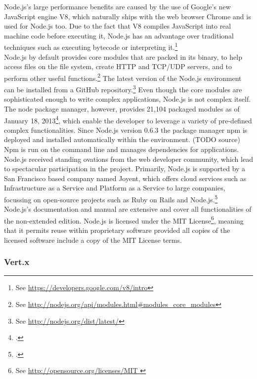 Node.js's large performance benefits are caused by the use of Google's new JavaScript engine V8, which naturally ships with the web browser Chrome and is used for Node.js too. Due to the fact that V8 compiles JavaScript into
real machine code before executing it, Node.js has an advantage over 
traditional techniques such as executing bytecode or interpreting it.\footnote{See \url{https://developers.google.com/v8/intro}}
\\
Node.js by default provides core modules that are packed in its binary, to help
access files on the file system, create HTTP and TCP/UDP servers, and to perform
other useful functions.\footnote{See \url{http://nodejs.org/api/modules.html\#modules_core_modules}}
The latest version of the Node.js environment can be installed from a GitHub repository.\footnote{See \url{http://nodejs.org/dist/latest/}}
Even though the core modules are sophisticated enough to write complex applications, Node.js is not complex itself.
The node package manager, however, provides 21,104 packaged modules as of January 18, 2013\footcite[Cf.][]{node_packages}, which enable the developer to leverage a variety of pre-defined complex functionalities.
Since Node.js version 0.6.3 the package manager npm is deployed and installed automatically within the environment. (TODO source) Npm is run on the command line and manages dependencies for applications.\\
Node.js received standing ovations from the web developer community, which lead to spectacular participation in the project. Primarily, Node.js is supported by a San Francisco based company named Joyent, which offers cloud services such as Infrastructure as a Service and Platform as a Service to large companies, focussing on open-source projects such as Ruby on Rails and Node.js.\footcite[Cf.][]{http://jaxenter.com/node-js-moves-to-joyent-32530.html}\\
Node.js's documentation and manual are extensive and cover all functionalities of the non-extended edition.
Node.js is licensed under the MIT License\footnote{See \url{http://opensource.org/licenses/MIT }}, meaning that it permits reuse within proprietary software provided all copies of the licensed software include a copy of the MIT License terms.\\



\subsubsection{Vert.x}
\label{Vert.x}

